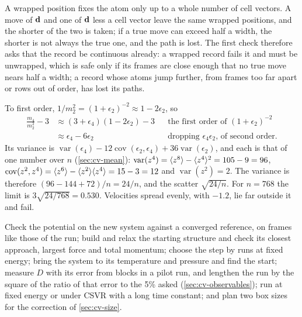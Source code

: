 A wrapped position fixes the atom only up to a
whole number of cell vectors. A move of $\bm{\mathrm{d}}$ and one of $\bm{\mathrm{d}}$ less a
cell vector leave the same wrapped positions, and the shorter of the two
is taken; if a true move can exceed half a width, the shorter is not
always the true one, and the path is lost. The first check therefore
asks that the record be continuous already: a wrapped record fails it and
must be unwrapped, which is safe only if its frames are close enough that
no true move nears half a width; a record whose atoms jump further, from
frames too far apart or rows out of order, has lost its paths.

To first order, $1/m_2^2 = (1 +
\epsilon_2)^{-2} \approx 1 - 2\epsilon_2$, so
\begin{align*}
   \frac{m_4}{m_2^2} - 3 &\approx (3 + \epsilon_4)(1 - 2\epsilon_2) - 3
      && \text{the first order of $(1 + \epsilon_2)^{-2}$}\\
   &\approx \epsilon_4 - 6\epsilon_2
      && \text{dropping $\epsilon_4\epsilon_2$, of second order.}
\end{align*}
Its variance is $\operatorname{var}(\epsilon_4) -
12\operatorname{cov}(\epsilon_2, \epsilon_4) + 36\operatorname{var}
(\epsilon_2)$, and each is that of one number over $n$
(\cref{sec:cv-mean}): $\operatorname{var}(z^4) = \langle z^8 \rangle - \langle z^4 \rangle^2 =
105 - 9 = 96$, $\operatorname{cov}(z^2, z^4) = \langle z^6 \rangle -
\langle z^2 \rangle\langle z^4 \rangle = 15 - 3 = 12$ and $\operatorname{var}(z^2) = 2$. The
variance is therefore $(96 - 144 + 72)/n = 24/n$, and the scatter
$\sqrt{24/n}$. For $n = 768$ the limit is $3\sqrt{24/768} = 0.530$.
Velocities spread evenly, with $-1.2$, lie far outside it and fail.

Check the potential on the new system against a
converged reference, on frames like those of the run; build and relax the
starting structure and check its closest approach, largest force and total
momentum; choose the step by runs at fixed energy; bring the system to
its temperature and pressure and find the start; measure $D$ with its
error from blocks in a pilot run, and lengthen the run by the square of
the ratio of that error to the 5\% asked (\cref{sec:cv-observables});
run at fixed energy or under CSVR with a long time constant; and plan two
box sizes for the correction of \cref{sec:cv-size}.
